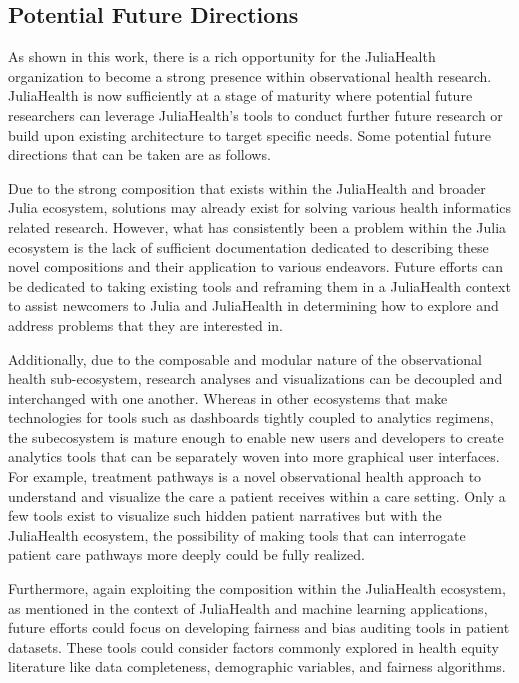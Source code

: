 \documentclass{juliacon}
\begin{document}
\subsection{Potential Future Directions}

As shown in this work, there is a rich opportunity for the JuliaHealth organization to become a strong presence within observational health research. 
JuliaHealth is now sufficiently at a stage of maturity where potential future researchers can leverage JuliaHealth's tools to conduct further future research or build upon existing architecture to target specific needs.
Some potential future directions that can be taken are as follows.

Due to the strong composition that exists within the JuliaHealth and broader Julia ecosystem, solutions may already exist for solving various health informatics related research.
However, what has consistently been a problem within the Julia ecosystem is the lack of sufficient documentation dedicated to describing these novel compositions and their application to various endeavors.
Future efforts can be dedicated to taking existing tools and reframing them in a JuliaHealth context to assist newcomers to Julia and JuliaHealth in determining how to explore and address problems that they are interested in.

Additionally, due to the composable and modular nature of the observational health sub-ecosystem, research analyses and visualizations can be decoupled and interchanged with one another.
Whereas in other ecosystems that make technologies for tools such as dashboards tightly coupled to analytics regimens, the subecosystem is mature enough to enable new users and developers to create analytics tools that can be separately woven into more graphical user interfaces.
For example, treatment pathways is a novel observational health approach to understand and visualize the care a patient receives within a care setting.
Only a few tools exist to visualize such hidden patient narratives but with the JuliaHealth ecosystem, the possibility of making tools that can interrogate patient care pathways more deeply could be fully realized.

Furthermore, again exploiting the composition within the JuliaHealth ecosystem, as mentioned in the context of JuliaHealth and machine learning applications, future efforts could focus on developing fairness and bias auditing tools in patient datasets.
These tools could consider factors commonly explored in health equity literature like data completeness, demographic variables, and fairness algorithms. 
\end{document}
